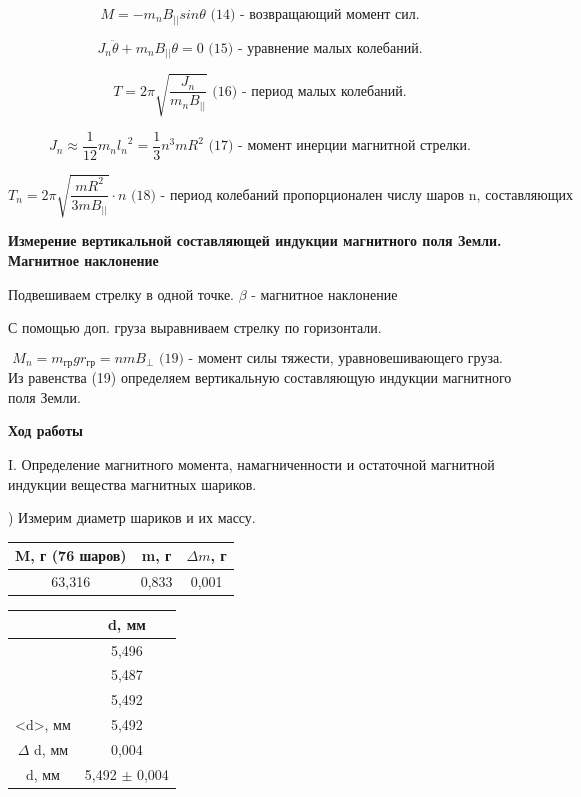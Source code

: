 \documentclass[a4paper,12pt]{article}
\begin{document}
$$ M = -m_nB_{||}sin\theta \text{ (14)  - возвращающий момент сил.} $$

$$ J_n{\ddot{\theta}} + m_nB_{||}\theta = 0 \text{ (15) - уравнение малых колебаний.} $$ 

$$ T = 2\pi \sqrt{\frac{J_n}{m_nB_{||}}}  \text{ (16) - период малых колебаний.} $$

$$ J_n \approx \frac{1}{12}m_n{l_n}^2 = \frac{1}{3}n^3mR^2  \text{ (17) - момент инерции магнитной стрелки.}  $$

$$ T_n = 2\pi\sqrt{\frac{mR^2}{3mB_{||}}} \cdot n \text{ (18) - период колебаний пропорционален числу шаров n, составляющих "стрелку".} $$ 

\textbf{Измерение вертикальной составляющей индукции магнитного поля Земли. Магнитное наклонение}

Подвешиваем стрелку в одной точке. $\beta$ - магнитное наклонение

С помощью доп. груза выравниваем стрелку по горизонтали.  

$$ M_n = m_{гр}gr_{гр} = nmB_{\perp} \text{ (19) - момент силы тяжести, уравновешивающего груза. } $$ 
Из равенства (19) определяем вертикальную составляющую индукции магнитного поля Земли. 


\textbf{Ход работы}

\noindent I. Определение магнитного момента, намагниченности и остаточной магнитной индукции вещества магнитных шариков. 

) Измерим диаметр шариков и их массу.

\begin{center}
\begin{tabular}{|c|c|c|}
	\hline
	M, г (76 шаров) & m, г & $\Delta m$, г \\
	\hline
	63,316 & 0,833 & 0,001 \\
	\hline
\end{tabular}
\end{center}
\qquad
\begin{center}
\begin{tabular}{|c|c|}
	\hline
	& d, мм \\
	\hline
	& 5,496 \\
	\hline
	& 5,487 \\
	\hline
	& 5,492 \\
	\hline
	<d>, мм & 5,492 \\
	\hline
	$\Delta$ d, мм & 0,004 \\
	\hline
	d, мм & 5,492 $\pm$ 0,004 \\
	\hline
\end{tabular}
\end{center}
\end{document}
